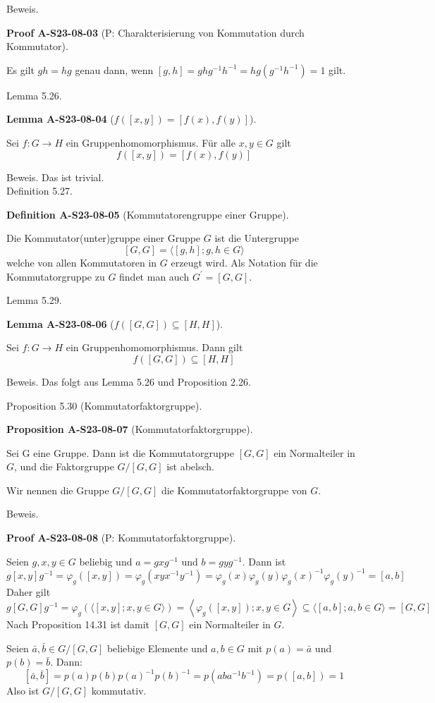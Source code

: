 \documentclass[10pt, letterpaper]{article}
\newcommand{\CustomHeading}[3]{%
  \par\medskip\noindent%
  \textbf{#1 #2} \textnormal{(#3)}.\enskip%
}
\newenvironment{DEF}[2]{\begin{unitbox}\CustomHeading{Definition}{#1}{#2}}{\end{unitbox}}
\newenvironment{PROP}[2]{\begin{unitbox}\CustomHeading{Proposition}{#1}{#2}}{\end{unitbox}}
\newenvironment{LEM}[2]{\begin{unitbox}\CustomHeading{Lemma}{#1}{#2}}{\end{unitbox}}
\newenvironment{PROOF}[2]{\begin{unitbox}\CustomHeading{Proof}{#1}{#2}}{\end{unitbox}}
\begin{document}
Beweis. 

\begin{PROOF}{A-S23-08-03}{P: Charakterisierung von Kommutation durch Kommutator}
Es gilt $g h=h g$ genau dann, wenn $[g, h]=g h g^{-1} h^{-1}=h g\left(g^{-1} h^{-1}\right)=1$ gilt.
\end{PROOF}


Lemma 5.26. 

\begin{LEM}{A-S23-08-04}{$ f([x, y])=[f(x), f(y)] $}
Sei $f: G \rightarrow H$ ein Gruppenhomomorphismus. Für alle $x, y \in G$ gilt
$$
f([x, y])=[f(x), f(y)]
$$
\end{LEM}

Beweis. Das ist trivial.\\


Definition 5.27. 

\begin{DEF}{A-S23-08-05}{Kommutatorengruppe einer Gruppe}
Die Kommutator(unter)gruppe einer Gruppe $G$ ist die Untergruppe
$$
[G, G]=\langle[g, h] ; g, h \in G\rangle
$$
welche von allen Kommutatoren in $G$ erzeugt wird. Als Notation für die Kommutatorgruppe zu $G$ findet man auch $G^{\prime}=[G, G]$.
\end{DEF}


Lemma 5.29. 

\begin{LEM}{A-S23-08-06}{$ f([G, G]) \subseteq[H, H] $}
Sei $f: G \rightarrow H$ ein Gruppenhomomorphismus. Dann gilt
$$
f([G, G]) \subseteq[H, H]
$$
\end{LEM}

Beweis. Das folgt aus Lemma 5.26 und Proposition 2.26.


Proposition 5.30 (Kommutatorfaktorgruppe). 

\begin{PROP}{A-S23-08-07}{Kommutatorfaktorgruppe}
Sei G eine Gruppe. Dann ist die Kommutatorgruppe $[G, G]$ ein Normalteiler in $G$, und die Faktorgruppe $G /[G, G]$ ist abelsch.

Wir nennen die Gruppe $G /[G, G]$ die Kommutatorfaktorgruppe von $G$.
\end{PROP}

Beweis. 

\begin{PROOF}{A-S23-08-08}{P: Kommutatorfaktorgruppe}
Seien $g, x, y \in G$ beliebig und $a=g x g^{-1}$ und $b=g y g^{-1}$. Dann ist
$$
g[x, y] g^{-1}=\varphi_{g}([x, y])=\varphi_{g}\left(x y x^{-1} y^{-1}\right)=\varphi_{g}(x) \varphi_{g}(y) \varphi_{g}(x)^{-1} \varphi_{g}(y)^{-1}=[a, b]
$$
Daher gilt
$$
g[G, G] g^{-1}=\varphi_{g}(\langle[x, y] ; x, y \in G\rangle)=\left\langle\varphi_{g}([x, y]) ; x, y \in G\right\rangle \subseteq\langle[a, b] ; a, b \in G\rangle=[G, G]
$$
Nach Proposition 14.31 ist damit $[G, G]$ ein Normalteiler in $G$.

Seien $\bar{a}, \bar{b} \in G /[G, G]$ beliebige Elemente und $a, b \in G$ mit $p(a)=\bar{a}$ und $p(b)=\bar{b}$. Dann:
$$
[\bar{a}, \bar{b}]=p(a) p(b) p(a)^{-1} p(b)^{-1}=p\left(a b a^{-1} b^{-1}\right)=p([a, b])=1
$$
Also ist $G /[G, G]$ kommutativ.
\end{PROOF}
\end{document}
